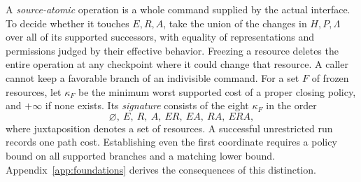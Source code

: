 A \emph{source-atomic} operation is a whole command supplied by the actual interface. To decide whether it touches \(E,R,A\), take the union of the changes in \(H,P,\Lambda\) over all of its supported successors, with equality of representations and permissions judged by their effective behavior. Freezing a resource deletes the entire operation at any checkpoint where it could change that resource. A caller cannot keep a favorable branch of an indivisible command. For a set \(F\) of frozen resources, let \(\kappa_F\) be the minimum worst supported cost of a proper closing policy, and \(+\infty\) if none exists. Its \emph{signature} consists of the eight \(\kappa_F\) in the order
\[
 \varnothing,\ E,\ R,\ A,\ ER,\ EA,\ RA,\ ERA,
\]
where juxtaposition denotes a set of resources. A successful unrestricted run records one path cost. Establishing even the first coordinate requires a policy bound on all supported branches and a matching lower bound. Appendix~\ref{app:foundations} derives the consequences of this distinction.
